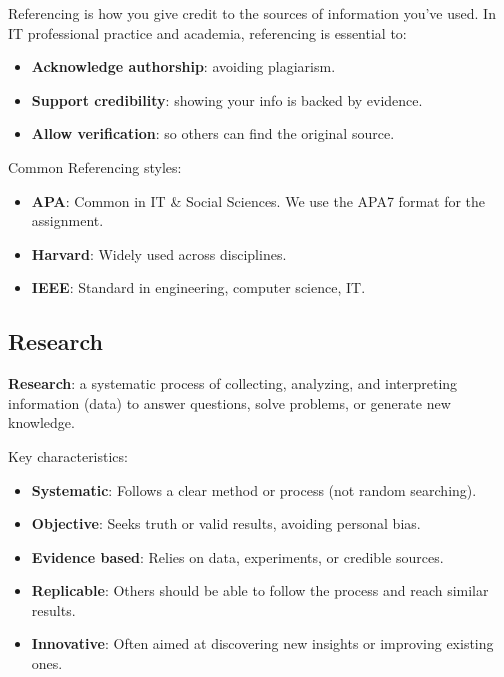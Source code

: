 \indent

Referencing is how you give credit to the sources of information you’ve used. In IT professional practice and academia, referencing is essential to: 

\begin{itemize}
    \item \textbf{Acknowledge authorship}: avoiding plagiarism.
    \item \textbf{Support credibility}: showing your info is backed by evidence.
    \item \textbf{Allow verification}: so others can find the original source.
\end{itemize}

Common Referencing styles:

\begin{itemize}
    \item \textbf{APA}: Common in IT \& Social Sciences. We use the APA7 format for the assignment.
    \item \textbf{Harvard}: Widely used across disciplines.
    \item \textbf{IEEE}: Standard in engineering, computer science, IT.
\end{itemize}

\subsection{Research}

\indent 

\noindent\textbf{Research}: a systematic process of collecting, analyzing, and interpreting information (data) to answer questions, solve problems, or generate new knowledge.

\bigskip

\noindent Key characteristics:

\begin{itemize}
    \item \textbf{Systematic}: Follows a clear method or process (not random searching).
    \item \textbf{Objective}: Seeks truth or valid results, avoiding personal bias.
    \item \textbf{Evidence based}: Relies on data, experiments, or credible sources.
    \item \textbf{Replicable}: Others should be able to follow the process and reach similar results.
    \item \textbf{Innovative}: Often aimed at discovering new insights or improving existing ones.
\end{itemize}

